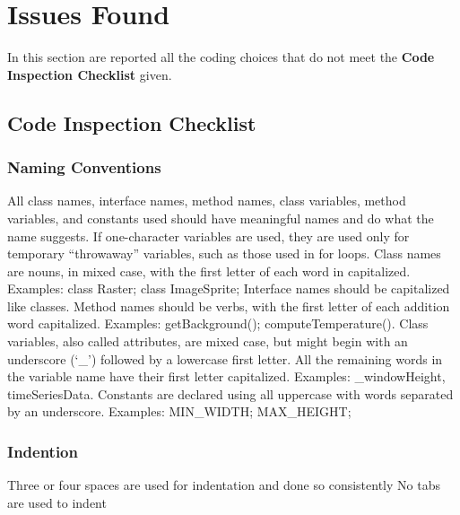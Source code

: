 \section{Issues Found}
In this section are reported all the coding choices that do not meet the \textbf{Code Inspection Checklist} given.

\subsection{Code Inspection Checklist}
\subsubsection{Naming Conventions}
\begin{itemize}
		All class names, interface names, method names, class variables, method variables, and constants used should have meaningful names and do what the name suggests.
		If one-character variables are used, they are used only for temporary “throwaway” variables, such as those used in for loops.
		Class names are nouns, in mixed case, with the first letter of each word in capitalized. Examples: class Raster; class ImageSprite;
		Interface names should be capitalized like classes.
		Method names should be verbs, with the first letter of each addition word capitalized. Examples: getBackground(); computeTemperature().
		Class variables, also called attributes, are mixed case, but might begin with an underscore (‘\_’) followed by a lowercase first letter. All the remaining words in the variable name have their first letter capitalized. Examples: \_windowHeight, timeSeriesData.
		Constants are declared using all uppercase with words separated by an underscore. Examples: MIN\_WIDTH; MAX\_HEIGHT;
\end{itemize}

\subsubsection{Indention}
\begin{itemize}
		Three or four spaces are used for indentation and done so consistently
		No tabs are used to indent
\end{itemize}

